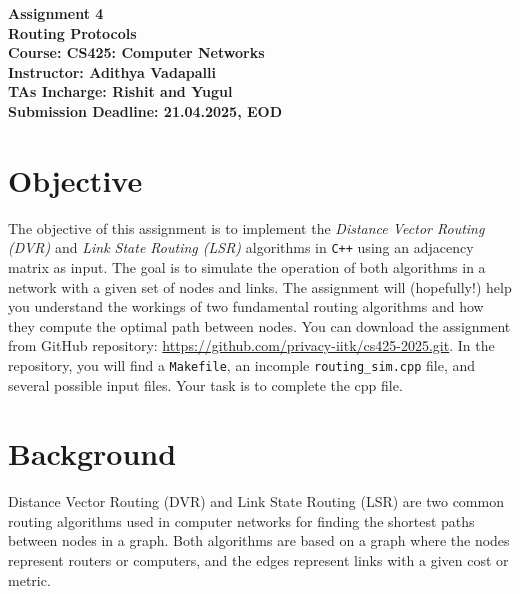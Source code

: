\documentclass[12pt,a4paper]{article}
\begin{document}
\begin{titlepage}
    \centering
    \vspace{2cm}
    \vspace{1cm}

    {\Huge \textbf{Assignment 4}}\\[1cm]
    {\Large \textbf{Routing Protocols}}\\[2cm]

    \textbf{Course: CS425: Computer Networks}\\[0.5cm]
    \textbf{Instructor:  Adithya Vadapalli }\\[0.5cm]
    \textbf{TAs Incharge: Rishit and Yugul}\\[3cm]

    \vfill
    \textbf{Submission Deadline: 21.04.2025, EOD}\\[0.5cm]
    \vfill

\end{titlepage}

\section*{Objective}
The objective of this assignment is to implement the \emph{Distance Vector Routing (DVR)} and \emph{Link State Routing (LSR)} algorithms in \texttt{C++} using an adjacency matrix as input. The goal is to simulate the operation of both algorithms in a network with a given set of nodes and links. The assignment will (hopefully!) help you understand the workings of two fundamental routing algorithms and how they compute the optimal path between nodes.
You can download the assignment from GitHub repository: \url{https://github.com/privacy-iitk/cs425-2025.git}. In the repository, you will find a \texttt{Makefile}, an incomple \texttt{routing\_sim.cpp} file, and several possible input files. Your task is to complete the cpp file. 



\section*{Background}
Distance Vector Routing (DVR) and Link State Routing (LSR) are two common routing algorithms used in computer networks for finding the shortest paths between nodes in a graph. Both algorithms are based on a graph where the nodes represent routers or computers, and the edges represent links with a given cost or metric.
 
\end{document}
